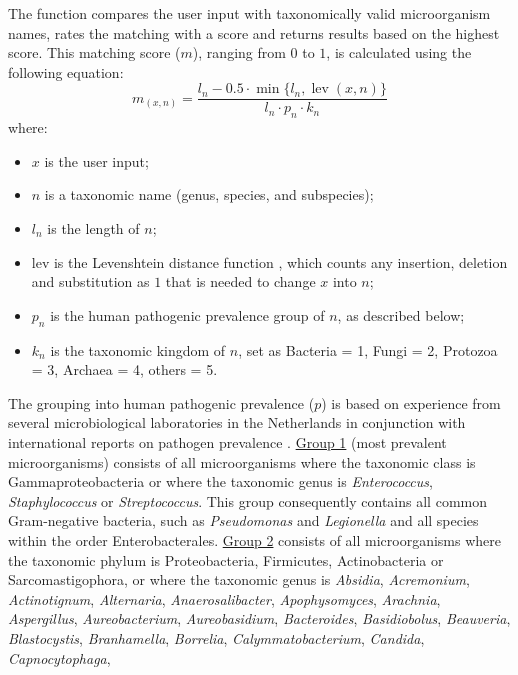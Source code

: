 \documentclass[article, shortnames]{jss}
\newcommand{\fct}[1]{\code{#1()}}
\begin{document}
The \fct{as.mo} function compares the user input with taxonomically valid
microorganism names, rates the matching with a score and returns results
based on the highest score.  This matching score ($m$), ranging from $0$ to
$1$, is calculated using the following equation:
%
\begin{equation*}
\label{eq:mo_uncertainty}
m_{(x,n)} = \frac{l_{n} - 0.5 \cdot \min\{ l_n, \operatorname{lev}(x,n) \} }{l_{n} \cdot p_{n} \cdot k_{n}}
\end{equation*}
%
where:
%
\begin{itemize}
  \item{$x$ is the user input;}
  \item{$n$ is a taxonomic name (genus, species, and subspecies);}
  \item{$l_n$ is the length of $n$;}
  \item{lev is the Levenshtein distance function \citep{Levenshtein1966},
  which counts any insertion, deletion and substitution as $1$ that is needed
  to change $x$ into $n$;}
  \item{$p_n$ is the human pathogenic prevalence group of $n$, as described
  below;}
  \item{$k_n$ is the taxonomic kingdom of $n$, set as Bacteria = 1, Fungi = 2,
  Protozoa = 3, Archaea = 4, others = 5.}
\end{itemize}
%
The grouping into human pathogenic prevalence ($p$) is based on experience
from several microbiological laboratories in the Netherlands in conjunction
with international reports on pathogen prevalence \citep{De_Greeff2019-xl,
EARS_Net, World_Health_Organization2018-bn}.  \underline{Group 1} (most
prevalent microorganisms) consists of all microorganisms where the taxonomic
class is Gammaproteobacteria or where the taxonomic genus is
\emph{Enterococcus}, \emph{Staphylococcus} or \emph{Streptococcus}.  This
group consequently contains all common Gram-negative bacteria, such as
\emph{Pseudomonas} and \emph{Legionella} and all species within the order
Enterobacterales.  \underline{Group 2} consists of all microorganisms where
the taxonomic phylum is Proteobacteria, Firmicutes, Actinobacteria or
Sarcomastigophora, or where the taxonomic genus is \emph{Absidia},
\emph{Acremonium}, \emph{Actinotignum}, \emph{Alternaria},
\emph{Anaerosalibacter}, \emph{Apophysomyces}, \emph{Arachnia},
\emph{Aspergillus}, \emph{Aureobacterium}, \emph{Aureobasidium},
\emph{Bacteroides}, \emph{Basidiobolus}, \emph{Beauveria},
\emph{Blastocystis}, \emph{Branhamella}, \emph{Borrelia},
\emph{Calymmatobacterium}, \emph{Candida}, \emph{Capnocytophaga},
\end{document}

